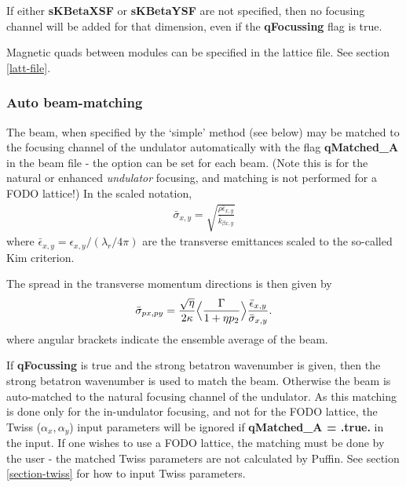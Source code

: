\documentclass[12pt]{article}%
\begin{document}
If either {\bf sKBetaXSF} or {\bf sKBetaYSF} are not specified, then no focusing channel will be added for that dimension, even if the {\bf qFocussing} flag is true.

Magnetic quads between modules can be specified in the lattice file. See section \ref{latt-file}.


\subsubsection{Auto beam-matching}

The beam, when specified by the `simple' method (see below) may be matched to the focusing channel of the undulator automatically with the flag {\bf qMatched\_A} in the beam file - the option can be set for each beam. (Note this is for the natural or enhanced \textit{undulator} focusing, and matching is not performed for a FODO lattice!) In the scaled notation,
\begin{align}
\bar{\sigma}_{x,y} = \sqrt{  \frac{ \rho \bar{\epsilon}_{x,y} }{\bar{k}_{\beta x,y} }  }
\end{align}
where $\bar{\epsilon}_{x,y} = \epsilon_{x,y} / (\lambda_r / 4\pi)$ are the transverse emittances scaled to the so-called Kim criterion.



The spread in the transverse momentum directions is then given by
\begin{align}
\bar{\sigma}_{px, py} = \frac{\sqrt{\eta}}{2 \kappa} \Bigl<  \frac{\Gamma}{1+\eta p_{2}}  \Bigr> \frac{ \bar{\epsilon}_{x,y} }{\bar{ \sigma}_{x,y}}.   \label{tmtch_spd}
\end{align}
where angular brackets indicate the ensemble average of the beam.

If {\bf qFocussing} is true and the strong betatron wavenumber is given, then the strong betatron wavenumber is used to match the beam. Otherwise the beam is auto-matched to the natural focusing channel of the undulator. As this matching is done only for the in-undulator focusing, and not for the FODO lattice, the Twiss ($\alpha_x, \alpha_y$) input parameters will be ignored if {\bf qMatched\_A = .true.} in the input. If one wishes to use a FODO lattice, the matching must be done by the user - the matched Twiss parameters are not calculated by Puffin. See section \ref{section-twiss} for how to input Twiss parameters.
\end{document}

